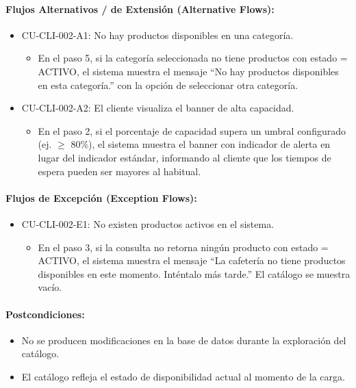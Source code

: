\paragraph{Flujos Alternativos / de Extensión (Alternative Flows):}
\begin{itemize}
    \item CU-CLI-002-A1: No hay productos disponibles en una categoría.
    \begin{itemize}
        \item En el paso 5, si la categoría seleccionada no tiene productos con estado = ACTIVO, el sistema muestra el mensaje ``No hay productos disponibles en esta categoría.'' con la opción de seleccionar otra categoría.
    \end{itemize}
    \item CU-CLI-002-A2: El cliente visualiza el banner de alta capacidad.
    \begin{itemize}
        \item En el paso 2, si el porcentaje de capacidad supera un umbral configurado (ej. $\ge$ 80\%), el sistema muestra el banner con indicador de alerta en lugar del indicador estándar, informando al cliente que los tiempos de espera pueden ser mayores al habitual.
    \end{itemize}
\end{itemize}

\paragraph{Flujos de Excepción (Exception Flows):}
\begin{itemize}
    \item CU-CLI-002-E1: No existen productos activos en el sistema.
    \begin{itemize}
        \item En el paso 3, si la consulta no retorna ningún producto con estado = ACTIVO, el sistema muestra el mensaje ``La cafetería no tiene productos disponibles en este momento. Inténtalo más tarde.'' El catálogo se muestra vacío.
    \end{itemize}
\end{itemize}

\paragraph{Postcondiciones:}
\begin{itemize}
    \item No se producen modificaciones en la base de datos durante la exploración del catálogo.
    \item El catálogo refleja el estado de disponibilidad actual al momento de la carga.
\end{itemize}

